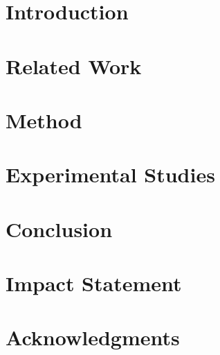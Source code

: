 \documentclass{article}
\numberwithin{equation}{section}
\begin{document}
\twocolumn[
\icmltitle{}


\vskip 0.3in
]

\printAffiliationsAndNotice{}  %

\begin{abstract}

\end{abstract}

\section{Introduction}
\label{sec:intro}


\section{Related Work}
\label{sec:related}


\section{Method}
\label{sec:method}


\section{Experimental Studies}
\label{sec:exp}


\section{Conclusion}
\label{sec:conclusion}


\section*{Impact Statement}


\section*{Acknowledgments}





\appendix

\end{document}
